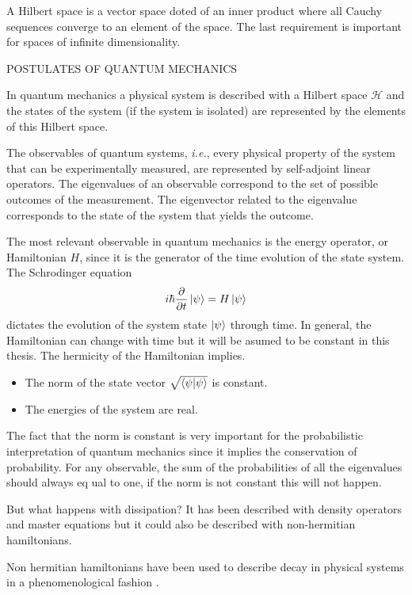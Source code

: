 A Hilbert space is a vector space doted of an inner product where all Cauchy sequences converge to an element of the space. The last requirement is important for spaces of infinite dimensionality.




POSTULATES OF QUANTUM MECHANICS

In quantum mechanics a physical system is described with a Hilbert space $\mathcal{H}$ and the states of the system (if the system is isolated) are represented by the elements of this Hilbert space.

The observables of quantum systems, \textit{i.e.}, every physical property of the system that can be experimentally measured, are represented by self-adjoint linear operators. The eigenvalues of an observable correspond to the set of possible outcomes of the measurement. The eigenvector related to the eigenvalue corresponds to the state of the system that yields the outcome.

The most relevant observable in quantum mechanics is the energy operator, or Hamiltonian $H$, since it is the generator of the time evolution of the state system. The Schrodinger equation
%
\begin{equation}
  i\hbar \frac{\partial}{\partial t} \ket{\psi} = H \ket{\psi}
\end{equation}
%
dictates the evolution of the system state $\ket{\psi}$ through time. In general, the Hamiltonian can change with time but it will be asumed to be constant in this thesis. The hermicity of the Hamiltonian implies.

\begin{itemize}
  \item The norm of the state vector $\sqrt{\braket{\psi}{\psi}}$ is constant.

  \item The energies of the system are real.
\end{itemize}


The fact that the norm is constant is very important for the probabilistic interpretation of quantum mechanics since it implies the conservation of probability. For any observable, the sum of the probabilities of all the eigenvalues should always eq ual to one, if the norm is not constant this will not happen.

But what happens with dissipation? It has been described with density operators and master equations but it could also be described with non-hermitian hamiltonians.

Non hermitian hamiltonians have been used to describe decay in physical systems in a phenomenological fashion \cite{Muga2004}.


